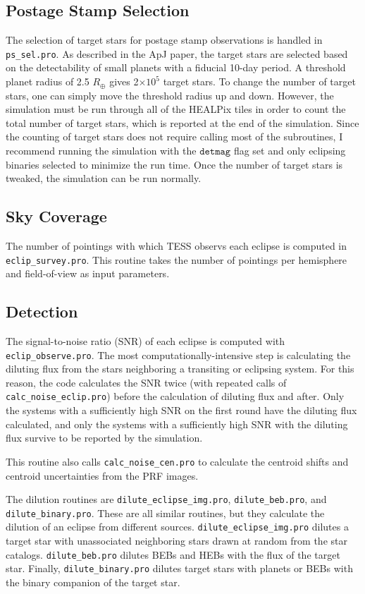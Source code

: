 \documentclass[preprint,10pt]{aastex}
\begin{document}
\subsection{Postage Stamp Selection}
The selection of target stars for postage stamp observations is handled in \texttt{ps\_sel.pro}. As described in the ApJ paper, the target stars are selected based on the detectability of small planets with a fiducial 10-day period. A threshold planet radius of 2.5 $R_{\oplus}$ gives 2$\times 10^5$ target stars. To change the number of target stars, one can simply move the threshold radius up and down. However, the simulation must be run through all of the HEALPix tiles in order to count the total number of target stars, which is reported at the end of the simulation. Since the counting of target stars does not require calling most of the subroutines, I recommend running the simulation with the $\texttt{detmag}$ flag set and only eclipsing binaries selected to minimize the run time. Once the number of target stars is tweaked, the simulation can be run normally. 

\subsection{Sky Coverage}
The number of pointings with which TESS observs each eclipse is computed in \texttt{eclip\_survey.pro}. This routine takes the number of pointings per hemisphere and field-of-view as input parameters.

\subsection{Detection}
The signal-to-noise ratio (SNR) of each eclipse is computed with \texttt{eclip\_observe.pro}. The most computationally-intensive step is calculating the diluting flux from the stars neighboring a transiting or eclipsing system. 
For this reason, the code calculates the SNR twice (with repeated calls of \texttt{calc\_noise\_eclip.pro}) before the calculation of diluting flux and after. Only the systems with a sufficiently high SNR on the first round have the diluting flux calculated, and only the systems with a sufficiently high SNR with the diluting flux survive to be reported by the simulation.

This routine also calls \texttt{calc\_noise\_cen.pro} to calculate the centroid shifts and centroid uncertainties from the PRF images.

The dilution routines are \texttt{dilute\_eclipse\_img.pro}, \texttt{dilute\_beb.pro}, and \texttt{dilute\_binary.pro}. 
These are all similar routines, but they calculate the dilution of an eclipse from different sources. 
\texttt{dilute\_eclipse\_img.pro} dilutes a target star with unassociated neighboring stars drawn at random from the star catalogs.
\texttt{dilute\_beb.pro} dilutes BEBs and HEBs with the flux of the target star. 
Finally, \texttt{dilute\_binary.pro} dilutes target stars with planets or BEBs with the binary companion of the target star.
\end{document}
